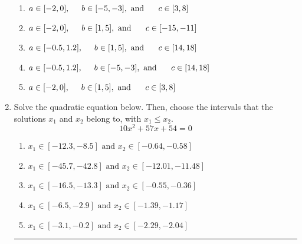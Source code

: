 \documentclass[14pt]{extbook}
\newcommand{\litem}[1]{\item#1\hspace*{-1cm}\rule{\textwidth}{0.4pt}}
\begin{document}
\begin{enumerate}
{\begin{center}
\end{center}
\begin{enumerate}[label=\Alph*.]
\item \( a \in [-2, 0], \hspace*{5mm} b \in [-5, -3], \text{ and } \hspace*{5mm} c \in [3, 8] \)
\item \( a \in [-2, 0], \hspace*{5mm} b \in [1, 5], \text{ and } \hspace*{5mm} c \in [-15, -11] \)
\item \( a \in [-0.5, 1.2], \hspace*{5mm} b \in [1, 5], \text{ and } \hspace*{5mm} c \in [14, 18] \)
\item \( a \in [-0.5, 1.2], \hspace*{5mm} b \in [-5, -3], \text{ and } \hspace*{5mm} c \in [14, 18] \)
\item \( a \in [-2, 0], \hspace*{5mm} b \in [1, 5], \text{ and } \hspace*{5mm} c \in [3, 8] \)

\end{enumerate} }
\litem{
Solve the quadratic equation below. Then, choose the intervals that the solutions $x_1$ and $x_2$ belong to, with $x_1 \leq x_2$.\[ 10x^{2} +57 x + 54 = 0 \]\begin{enumerate}[label=\Alph*.]
\item \( x_1 \in [-12.3, -8.5] \text{ and } x_2 \in [-0.64, -0.58] \)
\item \( x_1 \in [-45.7, -42.8] \text{ and } x_2 \in [-12.01, -11.48] \)
\item \( x_1 \in [-16.5, -13.3] \text{ and } x_2 \in [-0.55, -0.36] \)
\item \( x_1 \in [-6.5, -2.9] \text{ and } x_2 \in [-1.39, -1.17] \)
\item \( x_1 \in [-3.1, -0.2] \text{ and } x_2 \in [-2.29, -2.04] \)


\end{enumerate}}
\end{enumerate}
\end{document}

